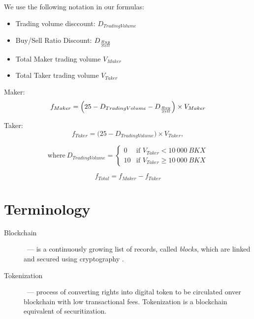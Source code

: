 \documentclass{article}
\begin{document}
We use the following notation in our formulas:
\begin{itemize}
    \item Trading volume disccount: $D_{Trading Volume}$
    \item Buy/Sell Ratio Discount: $D_{Buy\over{Sell}}$
    \item Total Maker trading volume $V_{Maker}$
    \item Total Taker trading volume $V_{Taker}$
\end{itemize}

Maker:
\begin{equation}
  f_{Maker} = \Big(25-D_{Trading Volume} - D_{Buy \over{Sell}}\Big) \times V_{Maker}
\end{equation}

Taker:
\begin{equation}
    f_{Taker} = \Big(25-D_{Trading Volume}\Big) \times V_{Taker},
\end{equation}

\begin{equation*}
    \text{where}~D_{Trading Volume} =
    \begin{cases} 
        0 & \text{if } V_{Taker} < 10~000~BKX \\
        10 & \text{if } V_{Taker} \geq 10~000~BKX
   \end{cases}
\end{equation*}

\begin{equation}
    f_{Total} = f_{Maker} - f_{Taker}
\end{equation}


\newpage
\appendix

\section{Terminology}
\begin{description}
\item[Blockchain]~--- is a continuously growing list of records, called \textit{blocks}, which are linked and secured using cryptography \cite{bitcoinComprehensive2016} \cite{wikipediaBlockchain}.
\item[Tokenization]~--- process of converting rights into digital token to be circulated onver blockchain with low transactional fees. Tokenization is a blockchain equivalent of securitization.
\end{description}

\printbibliography
\end{document}
